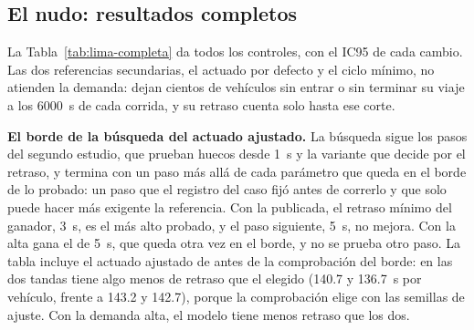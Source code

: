 \subsection*{El nudo: resultados completos}

La Tabla~\ref{tab:lima-completa} da todos los controles, con el IC95 de
cada cambio. Las dos referencias secundarias, el actuado por defecto y
el ciclo mínimo, no atienden la demanda: dejan cientos de vehículos sin
entrar o sin terminar su viaje a los 6000~s de cada corrida, y su
retraso cuenta solo hasta ese corte.

\noindent\textbf{El borde de la búsqueda del actuado ajustado.} La
búsqueda sigue los pasos del segundo estudio, que prueban huecos desde
1~s y la variante que decide por el retraso, y termina con un paso más
allá de cada parámetro que queda en el borde de lo probado: un paso que
el registro del caso fijó antes de correrlo y que solo puede hacer más
exigente la referencia. Con la publicada, el retraso mínimo del
ganador, 3~s, es el más alto probado, y el paso siguiente, 5~s, no
mejora. Con la alta gana el de 5~s, que queda otra vez en el borde, y no
se prueba otro paso. La tabla incluye el actuado ajustado de antes de la
comprobación del borde: en las dos tandas tiene algo menos de retraso
que el elegido (140.7 y 136.7~s por vehículo, frente a 143.2 y 142.7), porque
la comprobación elige con las semillas de ajuste. Con la demanda alta,
el modelo tiene menos retraso que los dos.

